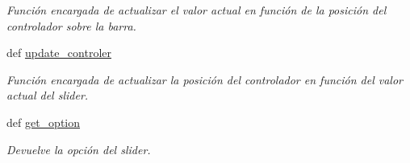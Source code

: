 \begin{DoxyCompactItemize}
\begin{DoxyCompactList}\small\item\em \-Función encargada de actualizar el valor actual en función de la posición del controlador sobre la barra. \end{DoxyCompactList}\item 
\hypertarget{classengine_1_1slider_1_1Slider_aef0326c194f5132904556f2b551fdc4b}{
def \hyperlink{classengine_1_1slider_1_1Slider_aef0326c194f5132904556f2b551fdc4b}{update\-\_\-controler}}
\label{classengine_1_1slider_1_1Slider_aef0326c194f5132904556f2b551fdc4b}

\begin{DoxyCompactList}\small\item\em \-Función encargada de actualizar la posición del controlador en función del valor actual del slider. \end{DoxyCompactList}\item 
\hypertarget{classengine_1_1slider_1_1Slider_a7922dbbbb3af0a35aa52cbf730a61956}{
def \hyperlink{classengine_1_1slider_1_1Slider_a7922dbbbb3af0a35aa52cbf730a61956}{get\-\_\-option}}
\label{classengine_1_1slider_1_1Slider_a7922dbbbb3af0a35aa52cbf730a61956}

\begin{DoxyCompactList}\small\item\em \-Devuelve la opción del slider. \end{DoxyCompactList}\end{DoxyCompactItemize}
